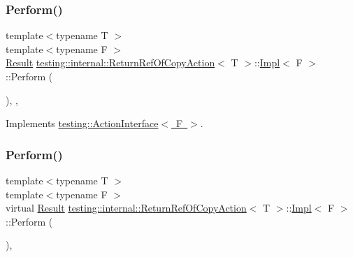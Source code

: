 \subsubsection{\texorpdfstring{Perform()}{Perform()}\hspace{0.1cm}{\footnotesize\ttfamily [2/3]}}
{\footnotesize\ttfamily template$<$typename T $>$ \\
template$<$typename F $>$ \\
\mbox{\hyperlink{classtesting_1_1_action_interface_a7477de2fe3e4e01c59db698203acaee7}{Result}} \mbox{\hyperlink{classtesting_1_1internal_1_1_return_ref_of_copy_action}{testing\+::internal\+::\+Return\+Ref\+Of\+Copy\+Action}}$<$ T $>$\+::\mbox{\hyperlink{classtesting_1_1internal_1_1_return_ref_of_copy_action_1_1_impl}{Impl}}$<$ F $>$\+::Perform (\begin{DoxyParamCaption}\item[{const \mbox{\hyperlink{classtesting_1_1_action_interface_af72720d864da4d606629e83edc003511}{Argument\+Tuple}} \&}]{ }\end{DoxyParamCaption})\hspace{0.3cm}{\ttfamily [inline]}, {\ttfamily [override]}, {\ttfamily [virtual]}}



Implements \mbox{\hyperlink{classtesting_1_1_action_interface_a20f8624fcea1786f2992b358760422a0}{testing\+::\+Action\+Interface$<$ F $>$}}.

\mbox{\label{classtesting_1_1internal_1_1_return_ref_of_copy_action_1_1_impl_aa208a2fce99a1e2e1913c89ec7a3bc5d}} 
\subsubsection{\texorpdfstring{Perform()}{Perform()}\hspace{0.1cm}{\footnotesize\ttfamily [3/3]}}
{\footnotesize\ttfamily template$<$typename T $>$ \\
template$<$typename F $>$ \\
virtual \mbox{\hyperlink{classtesting_1_1_action_interface_a7477de2fe3e4e01c59db698203acaee7}{Result}} \mbox{\hyperlink{classtesting_1_1internal_1_1_return_ref_of_copy_action}{testing\+::internal\+::\+Return\+Ref\+Of\+Copy\+Action}}$<$ T $>$\+::\mbox{\hyperlink{classtesting_1_1internal_1_1_return_ref_of_copy_action_1_1_impl}{Impl}}$<$ F $>$\+::Perform (\begin{DoxyParamCaption}\item[{const \mbox{\hyperlink{classtesting_1_1_action_interface_af72720d864da4d606629e83edc003511}{Argument\+Tuple}} \&}]{ }\end{DoxyParamCaption})\hspace{0.3cm}{\ttfamily [inline]}, {\ttfamily [virtual]}}



